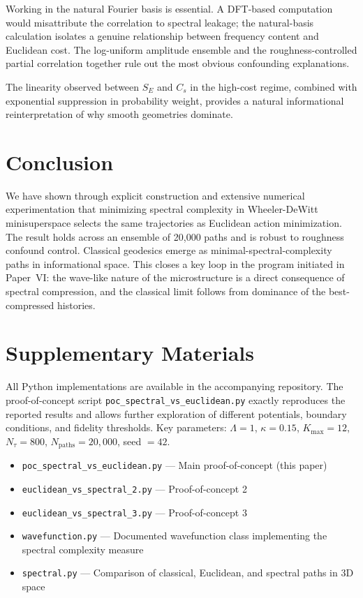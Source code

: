 \documentclass[11pt]{article}
\begin{document}
Working in the natural Fourier basis is essential. A DFT-based computation would misattribute the
correlation to spectral leakage; the natural-basis calculation isolates a genuine relationship
between frequency content and Euclidean cost.
The log-uniform amplitude ensemble and the roughness-controlled partial correlation together
rule out the most obvious confounding explanations.

The linearity observed between \(S_E\) and \(C_s\) in the high-cost regime,
combined with exponential suppression in probability weight, provides a natural informational
reinterpretation of why smooth geometries dominate.

\section{Conclusion}

We have shown through explicit construction and extensive numerical experimentation that minimizing spectral
complexity in Wheeler-DeWitt minisuperspace selects the same trajectories as Euclidean action minimization.
The result holds across an ensemble of 20{,}000 paths and is robust to roughness confound control.
Classical geodesics emerge as minimal-spectral-complexity paths in informational space.
This closes a key loop in the program initiated in Paper~VI: the wave-like nature of the microstructure
is a direct consequence of spectral compression, and the classical limit follows from dominance of the best-compressed histories.


\section*{Supplementary Materials}

All Python implementations are available in the accompanying repository. The proof-of-concept script \texttt{poc\_spectral\_vs\_euclidean.py} exactly reproduces the reported results and allows further exploration of different potentials, boundary conditions, and fidelity thresholds. Key parameters: \(\Lambda = 1\), \(\kappa = 0.15\), \(K_{\max} = 12\), \(N_\tau = 800\), \(N_{\text{paths}} = 20{,}000\), seed \(= 42\).

\begin{itemize}
    \item \texttt{poc\_spectral\_vs\_euclidean.py} --- Main proof-of-concept (this paper)
    \item \texttt{euclidean\_vs\_spectral\_2.py} --- Proof-of-concept 2
    \item \texttt{euclidean\_vs\_spectral\_3.py} --- Proof-of-concept 3
    \item \texttt{wavefunction.py} --- Documented wavefunction class implementing the spectral complexity measure
    \item \texttt{spectral.py} --- Comparison of classical, Euclidean, and spectral paths in 3D space
\end{itemize}

\printbibliography
\end{document}
